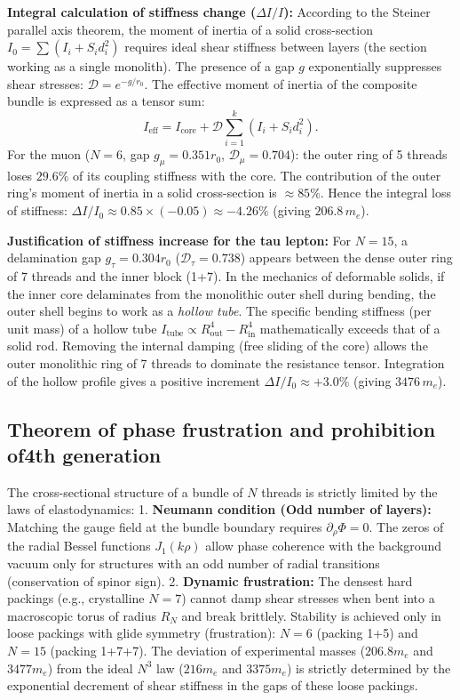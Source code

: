 \documentclass[11pt,a4paper]{article}
\begin{document}
\textbf{Integral calculation of stiffness change ($\Delta I/I$):}
According to the Steiner parallel axis theorem, the moment of inertia of a solid cross-section $I_0 = \sum (I_i + S_i d_i^2)$ requires ideal shear stiffness between layers (the section working as a single monolith). The presence of a gap $g$ exponentially suppresses shear stresses: $\mathcal{D} = e^{-g/r_0}$. The effective moment of inertia of the composite bundle is expressed as a tensor sum:
\begin{equation}
I_{\text{eff}} = I_{\text{core}} + \mathcal{D} \sum_{i=1}^{k} \left( I_i + S_i d_i^2 \right).
\end{equation}
For the muon ($N=6$, gap $g_\mu = 0.351 r_0$, $\mathcal{D}_\mu = 0.704$): the outer ring of 5 threads loses $29.6\%$ of its coupling stiffness with the core. The contribution of the outer ring's moment of inertia in a solid cross-section is $\approx 85\%$. Hence the integral loss of stiffness: $\Delta I / I_0 \approx 0.85 \times (-0.05) \approx -4.26\%$ (giving $206.8 \, m_e$).

\textbf{Justification of stiffness increase for the tau lepton:}
For $N=15$, a delamination gap $g_\tau = 0.304 r_0$ ($\mathcal{D}_\tau = 0.738$) appears between the dense outer ring of 7 threads and the inner block (1+7). In the mechanics of deformable solids, if the inner core delaminates from the monolithic outer shell during bending, the outer shell begins to work as a \textit{hollow tube}. 
The specific bending stiffness (per unit mass) of a hollow tube $I_{\text{tube}} \propto R_{\text{out}}^4 - R_{\text{in}}^4$ mathematically exceeds that of a solid rod. Removing the internal damping (free sliding of the core) allows the outer monolithic ring of 7 threads to dominate the resistance tensor. Integration of the hollow profile gives a positive increment $\Delta I / I_0 \approx +3.0\%$ (giving $3476 \, m_e$).
	
\subsection{Theorem of phase frustration and prohibition of4th generation}
The cross-sectional structure of a bundle of $N$ threads is strictly limited by the laws of elastodynamics:
1. \textbf{Neumann condition (Odd number of layers):} Matching the gauge field at the bundle boundary requires $\partial_\rho \Phi = 0$. The zeros of the radial Bessel functions $J_1(k\rho)$ allow phase coherence with the background vacuum only for structures with an odd number of radial transitions (conservation of spinor sign).
2. \textbf{Dynamic frustration:} The densest hard packings (e.g., crystalline $N=7$) cannot damp shear stresses when bent into a macroscopic torus of radius $R_N$ and break brittlely. Stability is achieved only in loose packings with glide symmetry (frustration): $N=6$ (packing 1+5) and $N=15$ (packing 1+7+7).
The deviation of experimental masses ($206.8 m_e$ and $3477 m_e$) from the ideal $N^3$ law ($216 m_e$ and $3375 m_e$) is strictly determined by the exponential decrement of shear stiffness in the gaps of these loose packings.
	
\end{document}
